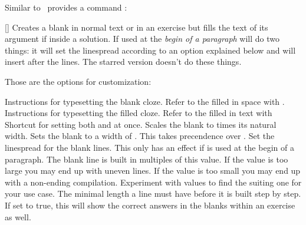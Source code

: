 \documentclass{xsim-manual}
\begin{document}
Similar to  \xsim\ provides a command :
\begin{commands}
  [\sarg{}]
    Creates a blank in normal text or in an exercise but fills the text of its
    argument if inside a solution.  If used at the \emph{begin of a paragraph}
     will do two things: it will set the linespread according to an
    option explained below and will insert  after the lines.  The
    starred version doesn't do these things.
\end{commands}

Those are the options for customization:
\begin{options}
    Instructions for typesetting the blank cloze.  Refer to the filled in
    space with .
    Instructions for typesetting the filled cloze.  Refer to the filled in text
    with 
    Shortcut for setting both  and 
    at once.
    Scales the blank to  times its natural width.
  \Default
    Sets the blank to a width of .  This takes precendence over
    .
    Set the linespread for the blank lines. This only has an effect if
     is used at the begin of a paragraph.
    The blank line is built in multiples of this value.  If the value is too
    large you may end up with uneven lines.  If the value is too small you may
    end up with a non-ending compilation.  Experiment with values to find the
    suiting one for your use case.
  \Default{\code{2em}}
    The minimal length a line must have before it is built step by step.
    If set to true, this will show the correct answers in the blanks within
    an exercise as well.
\end{options}
\end{document}
